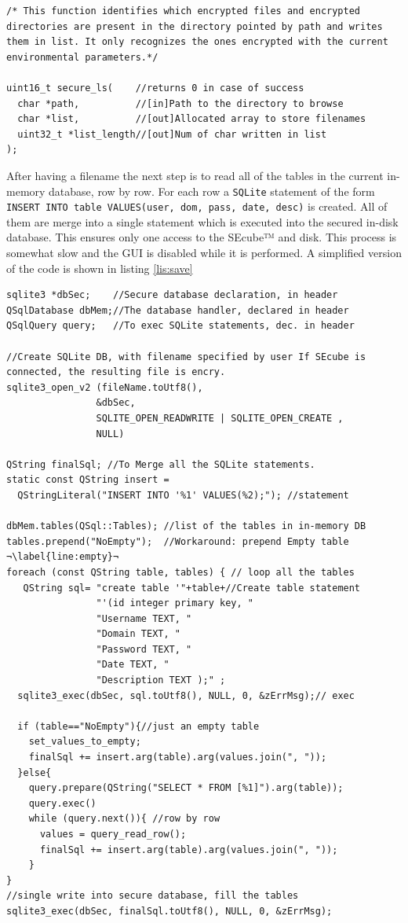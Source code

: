 \begin{lstlisting}[style=customc, float=htb, caption={secure\_ls declaration}, label = {lis:securels}]
 /* This function identifies which encrypted files and encrypted directories are present in the directory pointed by path and writes them in list. It only recognizes the ones encrypted with the current environmental parameters.*/
 
uint16_t secure_ls(    //returns 0 in case of success
  char *path,          //[in]Path to the directory to browse
  char *list,          //[out]Allocated array to store filenames
  uint32_t *list_length//[out]Num of char written in list
);
\end{lstlisting}


After having a filename the next step is to read all of the tables in the current in-memory database, row by row. For each row a \texttt{SQLite} statement of the form \texttt{INSERT INTO table VALUES(user, dom, pass, date, desc)} is created. All of them are merge into a single statement which is executed into the secured in-disk database. This ensures only one access to the SEcube™ and disk. This process is somewhat slow and the GUI is disabled while it is performed. A simplified version of the code is shown in listing \ref{lis:save} 

\begin{lstlisting}[style=customc, float=htb, caption={simplified Save process}, label = {lis:save}, escapechar=¬]
sqlite3 *dbSec;    //Secure database declaration, in header
QSqlDatabase dbMem;//The database handler, declared in header 
QSqlQuery query;   //To exec SQLite statements, dec. in header

//Create SQLite DB, with filename specified by user If SEcube is connected, the resulting file is encry.
sqlite3_open_v2 (fileName.toUtf8(),   
                &dbSec, 
                SQLITE_OPEN_READWRITE | SQLITE_OPEN_CREATE , 
                NULL) 
                
QString finalSql; //To Merge all the SQLite statements.
static const QString insert = 
  QStringLiteral("INSERT INTO '%1' VALUES(%2);"); //statement
  
dbMem.tables(QSql::Tables); //list of the tables in in-memory DB
tables.prepend("NoEmpty");  //Workaround: prepend Empty table   ¬\label{line:empty}¬
foreach (const QString table, tables) { // loop all the tables
   QString sql= "create table '"+table+//Create table statement 
                "'(id integer primary key, "
                "Username TEXT, "
                "Domain TEXT, "
                "Password TEXT, "
                "Date TEXT, "
                "Description TEXT );" ; 
  sqlite3_exec(dbSec, sql.toUtf8(), NULL, 0, &zErrMsg);// exec
  
  if (table=="NoEmpty"){//just an empty table
    set_values_to_empty;
    finalSql += insert.arg(table).arg(values.join(", "));
  }else{
    query.prepare(QString("SELECT * FROM [%1]").arg(table));
    query.exec()
    while (query.next()){ //row by row
      values = query_read_row();
      finalSql += insert.arg(table).arg(values.join(", "));
    }
}
//single write into secure database, fill the tables
sqlite3_exec(dbSec, finalSql.toUtf8(), NULL, 0, &zErrMsg);
\end{lstlisting}


